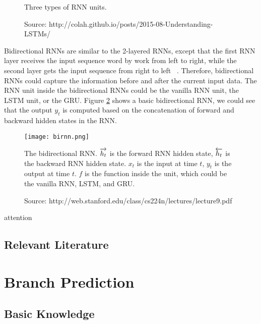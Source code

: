 \begin{figure}[H]
\centering
{}
\caption{Three types of RNN units.}
\caption*{Source: http://colah.github.io/posts/2015-08-Understanding-LSTMs/}
\label{fig:rnn_units}
\end{figure}

Bidirectional RNNs are similar to the 2-layered RNNs, except that the first RNN layer receives the input sequence word by work from left to right, while the second layer gets the input sequence from right to left ~\citep{schuster1997bidirectional}. Therefore, bidirectional RNNs could capture the information before and after the current input data. The RNN unit inside the bidirectional RNNs could be the vanilla RNN unit, the LSTM unit, or the GRU. Figure \ref{fig:birnn} shows a basic bidirectional RNN, we could see that the output $y_t$ is computed based on the concatenation of forward and backward hidden states in the RNN.

\begin{figure}[H]
\centering
\captionsetup{justification=centering,margin=1cm}
\texttt{[image: birnn.png]}
\caption{The bidirectional RNN. $\protect\overrightarrow{h_t}$ is the forward RNN hidden state,  $\protect\overleftarrow{h_t}$ is the backward RNN hidden state. $x_t$ is the input at time $t$, $y_t$ is the output at time $t$. $f$ is the function inside the unit, which could be the vanilla RNN, LSTM, and GRU.}
\caption*{Source: http://web.stanford.edu/class/cs224n/lectures/lecture9.pdf}
\label{fig:birnn}
\end{figure}

attention

\subsection{Relevant Literature}
\label{sec:rl_rnn}

\section{Branch Prediction}
\label{sec:bp}

\subsection{Basic Knowledge}
\label{sec:bk_bp}

